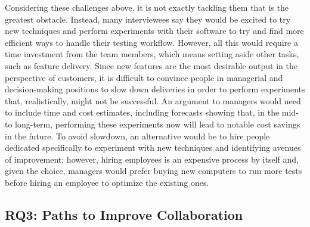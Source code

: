 Considering these challenges above, it is not exactly tackling them that is the greatest obstacle.
Instead, many interviewees say they would be excited to try new techniques and perform experiments with their software to try and find more efficient ways to handle their testing workflow.
However, all this would require a time investment from the team members, which means setting aside other tasks, such as feature delivery.
Since new features are the most desirable output in the perspective of customers, it is difficult to convince people in managerial and decision-making positions to slow down deliveries in order to perform experiments that, realistically, might not be successful.
An argument to managers would need to include time and cost estimates, including forecasts showing that, in the mid- to long-term, performing these experiments now will lead to notable cost savings in the future.
To avoid slowdown, an alternative would be to hire people dedicated specifically to experiment with new techniques and identifying avenues of improvement; however, hiring employees is an expensive process by itself and, given the choice, managers would prefer buying new computers to run more tests before hiring an employee to optimize the existing ones.

\subsection{RQ3: Paths to Improve Collaboration}